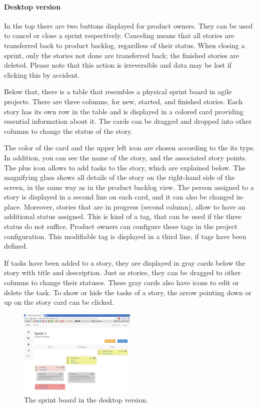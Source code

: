 \documentclass[
	accentcolor=tud1a %
]{tudreport}
\begin{document}
\paragraph{Desktop version}
In the top there are two buttons displayed for product owners. They can be used to cancel or close a sprint respectively. Canceling means that all stories are transferred back to product backlog, regardless of their status. When closing a sprint, only the stories not done are transferred back; the finished stories are deleted. Please note that this action is irreversible and data may be lost if clicking this by accident.

Below that, there is a table that resembles a physical sprint board in agile projects. There are three columns, for new, started, and finished stories. Each story has its own row in the table and is displayed in a colored card providing essential information about it. The cards can be dragged and dropped into other columns to change the status of the story.

The color of the card and the upper left icon are chosen according to the its type. In addition, you can see the name of the story, and the associated story points. The plus icon allows to add tasks to the story, which are explained below. The magnifying glass shows all details of the story on the right-hand side of the screen, in the same way as in the product backlog view. The person assigned to a story is displayed in a second line on each card, and it can also be changed in-place. Moreover, stories that are in progress (second column), allow to have an additional status assigned. This is kind of a tag, that can be used if the three status do not suffice. Product owners can configure these tags in the project configuration. This modifiable tag is displayed in a third line, if tags have been defined.

If tasks have been added to a story, they are displayed in gray cards below the story with title and description. Just as stories, they can be dragged to other columns to change their statuses. These gray cards also have icons to edit or delete the task. To show or hide the tasks of a story, the arrow pointing down or up on the story card can be clicked.

\begin{figure}[ht]
	\centering
	\includegraphics[width=0.5\textwidth]{img/sprintboard}
	\caption{The sprint board in the desktop version.}
	\label{fig:project-sprintboard}
\end{figure}
\end{document}
